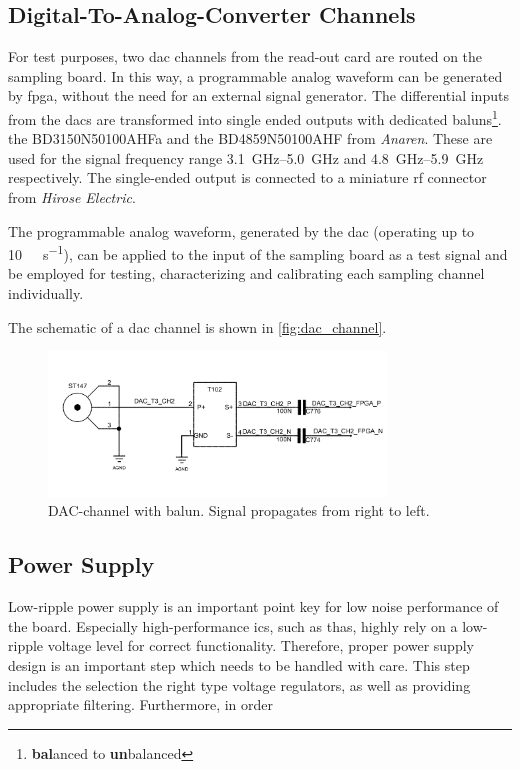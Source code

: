 \subsection{Digital-To-Analog-Converter Channels}
For test purposes, two \gls{dac} channels from the read-out card are routed on the sampling board.
In this way, a programmable analog waveform can be generated by \gls{fpga}, without the need for an external signal generator. 
The differential inputs from the \glspl{dac} are transformed into single ended outputs with dedicated baluns\footnote{\textbf{bal}anced to \textbf{un}balanced}. the BD3150N50100AHFa and the BD4859N50100AHF from \textit{Anaren}. 
These are used for the signal frequency range \SIrange{3.1}{5.0}{\GHz} and \SIrange{4.8}{5.9}{\GHz} respectively.
The single-ended output is connected to a miniature \gls{rf} connector from \textit{Hirose Electric}.

The programmable analog waveform, generated by the \gls{dac} (operating up to \SI{10}{\giga \sample \per \second}), can be applied to the input of the sampling board as a test signal and be employed for testing, characterizing and calibrating each sampling channel individually.

The schematic of a \gls{dac} channel is shown in \autoref{fig:dac_channel}.
\begin{figure}[H]
	\centering
	\includegraphics[width = 0.8\textwidth]{chap/04-theresa/img/schematic/dac_channel}
	\caption{DAC-channel with balun. Signal propagates from right to left.}
	\label{fig:dac_channel}
\end{figure}


\subsection{Power Supply}
Low-ripple power supply is an important point key for low noise performance of the board. Especially high-performance \Glspl{ic}, such as \glspl{tha}, highly rely on a low-ripple voltage level for correct functionality. 
Therefore, proper power supply design is an important step which needs to be handled with care.
This step includes the selection the right type voltage regulators, as well as providing appropriate filtering. 
Furthermore, in order 

